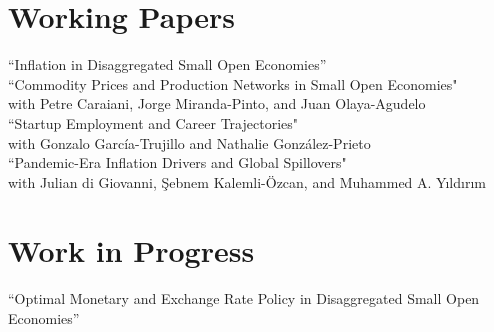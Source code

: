 \documentclass[10pt]{article}
\begin{document}
\section*{Working Papers}

\noindent ``Inflation in Disaggregated Small Open Economies''\\[-0.125in]

    \noindent ``Commodity Prices and Production Networks in Small Open Economies"\\
        \indent with Petre Caraiani, Jorge Miranda-Pinto, and Juan Olaya-Agudelo\\[-0.125in]

\noindent ``Startup Employment and Career Trajectories"\\
\indent with Gonzalo Garc\'ia-Trujillo and Nathalie Gonz\'alez-Prieto\\[-0.125in]

\noindent ``Pandemic-Era Inflation Drivers and Global Spillovers"\\
\indent with Julian di Giovanni, \c{S}ebnem Kalemli-\"{O}zcan, and Muhammed A. Y{\i}ld{\i}r{\i}m



\section*{Work in Progress}





\noindent ``Optimal Monetary and Exchange Rate Policy in Disaggregated Small Open Economies''\\[-0.125in]

\end{document}
